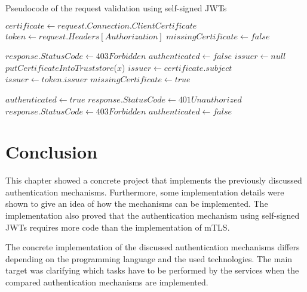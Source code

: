 \begin{algorithm}[H]
	\caption{Pseudocode of the request validation using self-signed JWTs}\label{alg:jwt}
	\begin{algorithmic}
		\State $certificate \gets request.Connection.ClientCertificate$
		\State $token \gets request.Headers[Authorization]$
		\State $missingCertificate \gets false$

		\State $response.StatusCode \gets 403Forbidden$
		\State $authenticated \gets false$
		\Else
		\State $issuer \gets null$
		\State $putCertificateIntoTruststore$($x$)
		\State $issuer \gets certificate.subject$
		\Else
		\State $issuer \gets token.issuer$
		\Else
		\State $missingCertificate \gets true$
		\EndIf
		\EndIf

		\State $authenticated \gets true$
		\Else
		\State $response.StatusCode \gets 401Unauthorized$
		\Else
		\State $response.StatusCode \gets 403Forbidden$
		\EndIf
		\State $authenticated \gets false$
		\EndIf
		\EndIf
	\end{algorithmic}
\end{algorithm}

\section{Conclusion}
This chapter showed a concrete project that implements the previously discussed authentication mechanisms.
Furthermore, some implementation details were shown to give an idea of how the mechanisms can be implemented.
The implementation also proved that the authentication mechanism using self-signed JWTs requires more code than the implementation of mTLS.

The concrete implementation of the discussed authentication mechanisms differs depending on the programming language and the used technologies.
The main target was clarifying which tasks have to be performed by the services when the compared authentication mechanisms are implemented.
